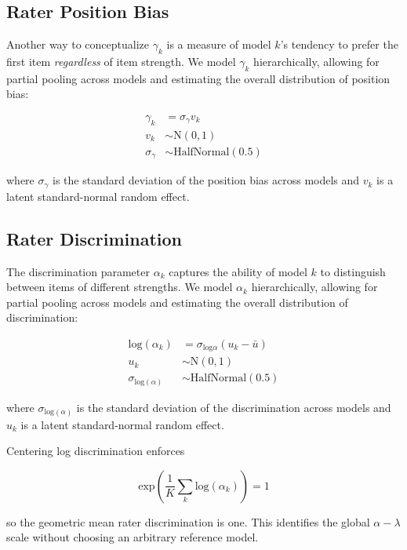 \documentclass[11pt]{article}
\begin{document}
\subsection{Rater Position Bias}
\label{appsubsec:rater_position_bias}

Another way to conceptualize $\gamma_k$ is a measure of model $k$'s tendency to prefer the first item \textit{regardless} of item strength. We model $\gamma_k$ hierarchically, allowing for partial pooling across models and estimating the overall distribution of position bias:

\[
\begin{aligned}
\gamma_k &= \sigma_{\gamma}v_k \\
v_k &\sim \text{N}(0, 1) \\
\sigma_{\gamma} &\sim \text{HalfNormal}(0.5)
\end{aligned}
\]

where $\sigma_{\gamma}$ is the standard deviation of the position bias across models and $v_k$ is a latent standard-normal random effect.

\subsection{Rater Discrimination}
\label{appsubsec:rater_discrimination}

The discrimination parameter $\alpha_k$ captures the ability of model $k$ to distinguish between items of different strengths. We model $\alpha_k$ hierarchically, allowing for partial pooling across models and estimating the overall distribution of discrimination:

\[
\begin{aligned}
\text{log}(\alpha_k) &= \sigma_{\text{log}{\alpha}}(u_k - \bar{u}) \\
u_k &\sim \text{N}(0, 1) \\
\sigma_{\text{log}(\alpha)} &\sim \text{HalfNormal}(0.5)
\end{aligned}
\]

where $\sigma_{\text{log}(\alpha)}$ is the standard deviation of the discrimination across models and $u_k$ is a latent standard-normal random effect.

Centering log discrimination enforces

\[
\text{exp}(\frac{1}{K} \sum_{k} \text{log}(\alpha_k)) = 1
\]

so the geometric mean rater discrimination is one. This identifies the global $\alpha-\lambda$ scale without choosing an arbitrary reference model.
\end{document}
